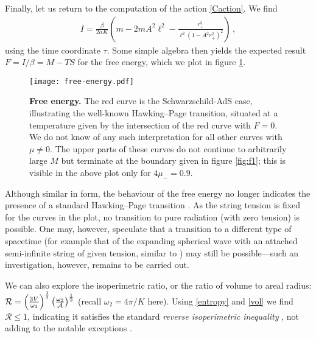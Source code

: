 \documentclass[
twoside,
openright,
frontopenright,
]{dmathesis}
\begin{document}
Finally, let us return to the computation of the action \eqref{Caction}.
We find
\begin{align}
I = \frac{\beta}{2\alpha K} \left( m - 2mA^2\ell^2
- \frac{r_+^3}{\ell^2(1-A^2r_+^2)^2} \right)\,,
\label{Caction}
\end{align}
using the time coordinate $\tau$. Some simple algebra then yields the
expected result $F=I/\beta=M-TS$
for the free energy, which we plot in figure \ref{fig:FE}.
\begin{figure}[tbp]
\centering
\texttt{[image: free-energy.pdf]}
\caption{\textbf{Free energy.}
The red curve is the Schwarzschild-AdS case, illustrating the
well-known Hawking--Page transition,  situated at a temperature
given by the intersection of the red curve with $F=0$. We do
not know of any such interpretation for all other curves with $\mu\neq 0$.
The upper parts of these curves do not continue to arbitrarily large $M$
but terminate at the boundary given in figure
\ref{fig:f1}; this is visible in the above plot only for $4\mu_- =0.9$.   }
\label{fig:FE}
\end{figure}

Although similar in form, the behaviour of the free energy no longer indicates
the presence of a standard Hawking--Page transition \cite{Hawking:1982dh}.
As the string tension is fixed for the curves in the plot, no transition to
pure radiation (with zero tension) is possible. One may, however, speculate that
a transition to a different type of spacetime (for example {that of the expanding spherical wave with an attached semi-infinite string of given tension, similar to} \cite{Podolsky:2004bk})
may still be possible---such an investigation, however, remains to be carried out.

We can also explore the isoperimetric ratio, or the ratio of volume to
areal radius: $\mathcal{R}=\left( \frac{3{V}}{\omega _{2}}\right)^{\frac{1}{3}}
\left(\frac{\omega _{2}}{{\cal A}}\right) ^{\frac{1}{2}}$ (recall $\omega_2=4\pi/K$
here). Using \eqref{entropy} and \eqref{vol} we find $\mathcal{R}\leq 1$,
indicating it satisfies the standard {\em reverse isoperimetric inequality}
\cite{Cvetic:2010jb}, not adding to the notable exceptions
\cite{Hennigar:2014cfa,Hennigar:2015cja,Brenna:2015pqa}.
\end{document}
